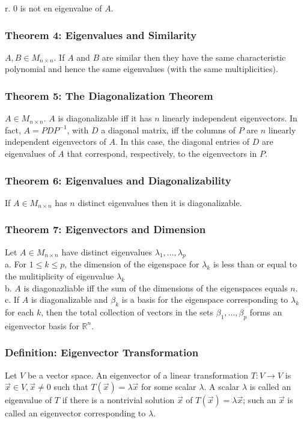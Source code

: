\documentclass{article}
\begin{document}
r. $0$ is not en eigenvalue of $A$.

\subsubsection*{Theorem 4: Eigenvalues and Similarity}
$A, B \in M_{n \times n}$. If $A$ and $B$ are similar then they have the same characteristic polynomial and hence the same eigenvalues (with the same multiplicities).

\subsubsection*{Theorem 5: The Diagonalization Theorem}
$A \in M_{n \times n}$. $A$ is diagonalizable iff it has $n$ linearly independent eigenvectors. 
In fact, $A = P D P^{-1}$, with $D$ a diagonal matrix, iff the columns of $P$ are $n$ linearly independent eigenvectors of $A$. In this case, the diagonal entries of $D$ are eigenvalues of $A$ that correspond, respectively, to the eigenvectors in $P$.

\subsubsection*{Theorem 6: Eigenvalues and Diagonalizability}
If $A \in M_{n \times n}$ has $n$ distinct eigenvalues then it is diagonalizable. 

\subsubsection*{Theorem 7: Eigenvectors and Dimension}
Let $A \in M_{n \times n}$ have distinct eigenvalues $\lambda_1 , \dots , \lambda_p$ \\
a. For $1 \leq k \leq p$, the dimension of the eigenspace for $\lambda_k$ is less than or equal to the mulitiplicity of eigenvalue $\lambda _k$ \\
b. $A$ is diagonazliable iff the sum of the dimensions of the eigenspaces equals $n$. \\
c. If $A$ is diagonalizable and $\beta_k$ is a basis for the eigenspace corresponding to $\lambda_k$ for each $k$, then the total collection of vectors in the sets $\beta_1 , \dots , \beta_p$ forms an eigenvector basis for $\mathbb{R}^n$.

\subsubsection*{Definition: Eigenvector Transformation}
Let $V$ be a vector space. An eigenvector of a linear transformation $T: V \rightarrow V$ is $\vec x \in V, \vec x \neq 0$ such that $T(\vec x) = \lambda \vec x$ for some scalar $\lambda$. A scalar $\lambda$ is called an eigenvalue of $T$ if there is a nontrivial solution $\vec x$ of $T(\vec x) = \lambda \vec x$; such an $\vec x$ is called an eigenvector corresponding to $\lambda$.
\end{document}
